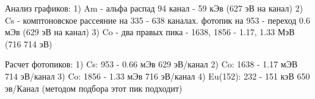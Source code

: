 \documentclass[a4paper,12pt]{article} %
\begin{document}
  Анализ графиков:
  1) Am - альфа распад 94 канал - 59 кЭв                  (627 эВ на канал)
  2) Cs - комптоновское рассеяние на 335 - 638 каналах. 
      фотопик на 953 - переход 0.6 мЭв                    (629 эВ на канал)
  3) Co - два правых пика - 1638, 1856 - 1.17, 1.33 МэВ   (716 714 эВ)

  Расчет фотопиков:
  1) Cs: 953 - 0.66 мЭв       629 эВ/канал
  2) Co: 1638 - 1.17 мЭВ      714 эВ/канал
  3) Co: 1856 - 1.33 мЭв      716 эВ/канал
  4) Eu(152): 232 - 151 кэВ   650 эв/Канал (методом подбора этот пик подходит)  
  
  
\end{document}
